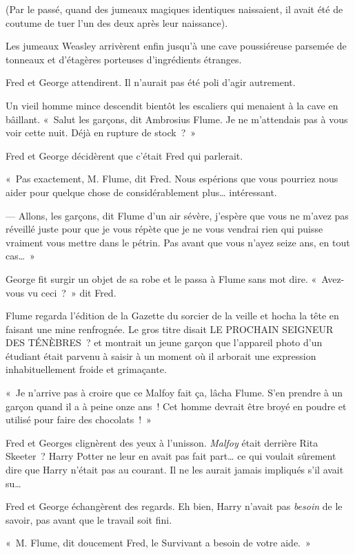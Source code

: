 (Par le passé, quand des jumeaux magiques identiques naissaient, il avait été de coutume de tuer l'un des deux après leur naissance).

Les jumeaux Weasley arrivèrent enfin jusqu'à une cave poussiéreuse parsemée de tonneaux et d'étagères porteuses d'ingrédients étranges.

Fred et George attendirent. Il n'aurait pas été poli d'agir autrement.

Un vieil homme mince descendit bientôt les escaliers qui menaient à la cave en bâillant. «~Salut les garçons, dit Ambrosius Flume. Je ne m'attendais pas à vous voir cette nuit. Déjà en rupture de stock~?~»

Fred et George décidèrent que c'était Fred qui parlerait.

«~Pas exactement, M. Flume, dit Fred. Nous espérions que vous pourriez nous aider pour quelque chose de considérablement plus… intéressant.

--- Allons, les garçons, dit Flume d'un air sévère, j'espère que vous ne m'avez pas réveillé juste pour que je vous répète que je ne vous vendrai rien qui puisse vraiment vous mettre dans le pétrin. Pas avant que vous n'ayez seize ans, en tout cas…~»

George fit surgir un objet de sa robe et le passa à Flume sans mot dire. «~Avez-vous vu ceci~?~» dit Fred.

Flume regarda l'édition de la Gazette du sorcier de la veille et hocha la tête en faisant une mine renfrognée. Le gros titre disait LE PROCHAIN SEIGNEUR DES TÉNÈBRES~? et montrait un jeune garçon que l'appareil photo d'un étudiant était parvenu à saisir à un moment où il arborait une expression inhabituellement froide et grimaçante.

«~Je n'arrive pas à croire que ce Malfoy fait ça, lâcha Flume. S'en prendre à un garçon quand il a à peine onze ans~! Cet homme devrait être broyé en poudre et utilisé pour faire des chocolats~!~»

Fred et Georges clignèrent des yeux à l'unisson. \emph{Malfoy} était derrière Rita Skeeter~? Harry Potter ne leur en avait pas fait part… ce qui voulait sûrement dire que Harry n'était pas au courant. Il ne les aurait jamais impliqués s'il avait su…

Fred et George échangèrent des regards. Eh bien, Harry n'avait pas \emph{besoin} de le savoir, pas avant que le travail soit fini.

«~M. Flume, dit doucement Fred, le Survivant a besoin de votre aide.~»


